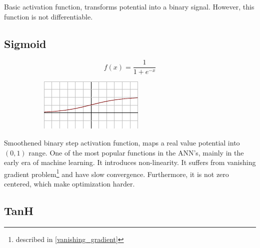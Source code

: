 \noindent
Basic activation function, transforms potential into a binary signal. However, this function is not differentiable.
      
\subsection*{Sigmoid}

\begin{figure}[H]
\raggedright
\begin{subfigure}{.28\textwidth}
  \centering
  \[ f(x) = \frac{1}{1 + e^{-x}} \]
\end{subfigure}%
\begin{subfigure}{.25\textwidth}
  \centering
  \includegraphics[width=\textwidth]{tex/images/activation/sigmoid}
\end{subfigure}
\end{figure}

\noindent
Smoothened binary step activation function, maps a real value potential into $(0,1)$ range. One of the most popular functions in the ANN's, mainly in the early era of machine learning. It introduces non-linearity. It suffers from vanishing gradient problem\footnote{described in \autoref{vanishing_gradient}} and have slow convergence. Furthermore, it is not zero centered, which make optimization harder.
 
\subsection*{TanH}


